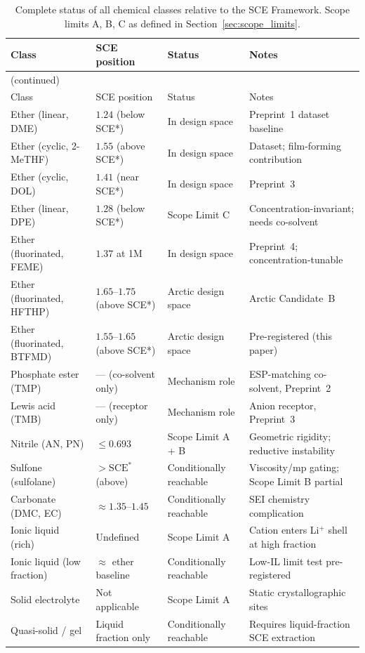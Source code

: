 \documentclass[11pt]{article}
\theoremstyle{plain}
\theoremstyle{definition}
\theoremstyle{remark}
\begin{document}
\begin{longtable}{p{3.5cm}p{2cm}p{2.5cm}p{6cm}}
\caption{Complete status of all chemical classes relative to
the SCE Framework.  Scope limits A, B, C as defined in
Section~\ref{sec:scope_limits}.}
\label{tab:class_status}\\
\toprule
Class & SCE position & Status &
  Notes \\
\midrule
\endfirsthead
\multicolumn{4}{l}{\small (continued)}\\
\toprule
Class & SCE position & Status & Notes \\
\midrule
\endhead
\bottomrule
\endfoot
\bottomrule
\endlastfoot
Ether (linear, DME) &
  $1.24$ (below SCE*) &
  In design space &
  Preprint~1 dataset baseline \\[3pt]
Ether (cyclic, 2-MeTHF) &
  $1.55$ (above SCE*) &
  In design space &
  Dataset; film-forming contribution \\[3pt]
Ether (cyclic, DOL) &
  $1.41$ (near SCE*) &
  In design space &
  Preprint~3 \\[3pt]
Ether (linear, DPE) &
  $1.28$ (below SCE*) &
  Scope Limit C &
  Concentration-invariant; needs co-solvent \\[3pt]
Ether (fluorinated, FEME) &
  $1.37$ at 1M &
  In design space &
  Preprint~4; concentration-tunable \\[3pt]
Ether (fluorinated, HFTHP) &
  $1.65$--$1.75$ (above SCE*) &
  Arctic design space &
  Arctic Candidate~B \\[3pt]
Ether (fluorinated, BTFMD) &
  $1.55$--$1.65$ (above SCE*) &
  Arctic design space &
  Pre-registered (this paper) \\[3pt]
Phosphate ester (TMP) &
  --- (co-solvent only) &
  Mechanism role &
  ESP-matching co-solvent, Preprint~2 \\[3pt]
Lewis acid (TMB) &
  --- (receptor only) &
  Mechanism role &
  Anion receptor, Preprint~3 \\[3pt]
Nitrile (AN, PN) &
  $\leq 0.693$ &
  Scope Limit A + B &
  Geometric rigidity; reductive instability \\[3pt]
Sulfone (sulfolane) &
  $> \mathrm{SCE}^{*}$ (above) &
  Conditionally reachable &
  Viscosity/mp gating; Scope Limit B partial \\[3pt]
Carbonate (DMC, EC) &
  $\approx 1.35$--$1.45$ &
  Conditionally reachable &
  SEI chemistry complication \\[3pt]
Ionic liquid (rich) &
  Undefined &
  Scope Limit A &
  Cation enters Li$^+$ shell at high fraction \\[3pt]
Ionic liquid (low fraction) &
  $\approx$ ether baseline &
  Conditionally reachable &
  Low-IL limit test pre-registered \\[3pt]
Solid electrolyte &
  Not applicable &
  Scope Limit A &
  Static crystallographic sites \\[3pt]
Quasi-solid / gel &
  Liquid fraction only &
  Conditionally reachable &
  Requires liquid-fraction SCE extraction \\[3pt]
\end{longtable}
\end{document}
